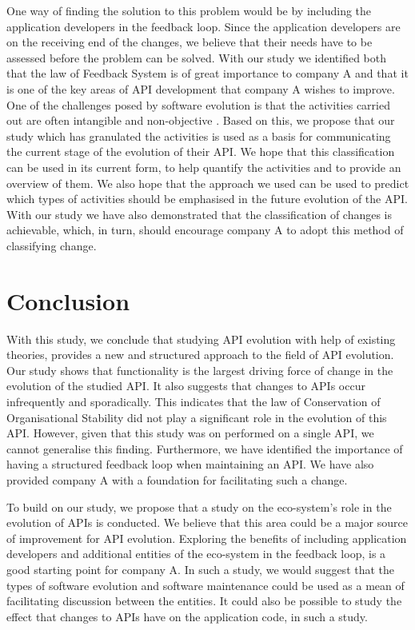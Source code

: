 \documentclass{sig-alternate}
\begin{document}
One way of finding the solution to this problem would be by including the application developers in the feedback loop. Since the application developers are on the receiving end of the changes, we believe that their needs have to be assessed before the problem can be solved. With our study we identified both that the law of Feedback System is of great importance to company A and that it is one of the key areas of API development that company A wishes to improve. One of the challenges posed by software evolution is that the activities carried out are often intangible and non-objective \cite{chapin2001types, lientz1980software}. Based on this, we propose that our study which has granulated the activities is used as a basis for communicating the current stage of the evolution of their API. We hope that this classification can be used in its current form, to help quantify the activities and to provide an overview of them. We also hope that the approach we used can be used to predict which types of activities should be emphasised in the future evolution of the API. With our study we have also demonstrated that the classification of changes is achievable, which, in turn, should encourage company A to adopt this method of classifying change.






\section{Conclusion} \label{conclusion}
With this study, we conclude that studying API evolution with help of existing theories, provides a new and structured approach to the field of API evolution. Our study shows that functionality is the largest driving force of change in the evolution of the studied API. It also suggests that changes to APIs occur infrequently and sporadically. This indicates that the law of Conservation of Organisational Stability did not play a significant role in the evolution of this API. However, given that this study was on performed on a single API, we cannot generalise this finding. Furthermore, we have identified the importance of having a structured feedback loop when maintaining an API. We have also provided company A with a foundation for facilitating such a change. 

To build on our study, we propose that a study on the eco-system's role in the evolution of APIs is conducted. We believe that this area could be a major source of improvement for API evolution. Exploring the benefits of including application developers and additional entities of the eco-system in the feedback loop, is a good starting point for company A. In such a study, we would suggest that the types of software evolution and software maintenance \cite{chapin2001types} could be used as a mean of facilitating discussion between the entities. It could also be possible to study the effect that changes to APIs have on the application code, in such a study. 
\end{document}
